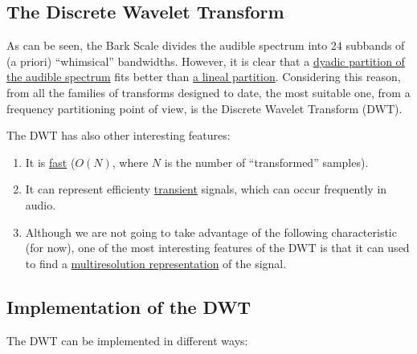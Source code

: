
\subsection{The Discrete Wavelet Transform}

As can be seen, the Bark Scale divides the audible spectrum into 24
subbands of (a priori) ``whimsical'' bandwidths. However, it is clear
that a \href{https://en.wikipedia.org/wiki/Octave_band}{dyadic
  partition of the audible spectrum} fits better than
\href{https://en.wikipedia.org/wiki/Wavelet_transform#Principle}{a
  lineal partition}. Considering this reason, from all the families of
transforms designed to date, the most suitable one, from a frequency
partitioning point of view, is the Discrete Wavelet Transform (DWT).

The DWT has also other interesting features:
\begin{enumerate}
\item It is
  \href{https://en.wikipedia.org/wiki/Discrete_wavelet_transform#Time_complexity}{fast}
  ($O(N)$, where $N$ is the number of ``transformed'' samples).
\item It can represent efficienty
  \href{https://en.wikipedia.org/wiki/Transient_(oscillation)}{transient}
  signals, which can occur frequently in audio.
\item Although we are not going to take advantage of the following
  characteristic (for now), one of the most interesting features of
  the DWT is that it can used to find a
  \href{https://en.wikipedia.org/wiki/Multiresolution_analysis}{multiresolution
    representation} of the signal.
\end{enumerate}


\subsection{Implementation of the DWT}

The DWT can be implemented in different ways:

